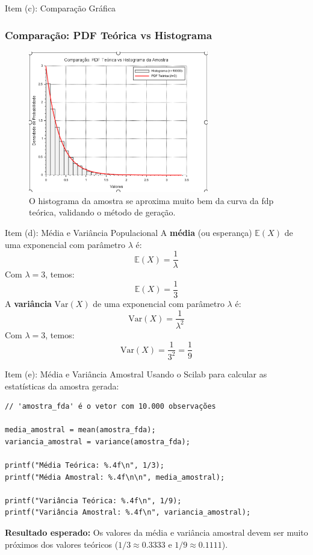 \begin{frame}{Item (c): Comparação Gráfica}
\frametitle{Comparação: PDF Teórica vs Histograma}
\begin{figure}
    \centering
    \includegraphics[width=0.7\textwidth]{figures/comparacao.png}
    \caption{O histograma da amostra se aproxima muito bem da curva da fdp teórica, validando o método de geração.}
    \label{fig:comparacao}
\end{figure}
\end{frame}


\begin{frame}{Item (d): Média e Variância Populacional}
A \textbf{média} (ou esperança) $\mathbb{E}(X)$ de uma exponencial com parâmetro $\lambda$ é:
\[
\mathbb{E}(X) = \frac{1}{\lambda}
\]
Com $\lambda = 3$, temos:
\[
\mathbb{E}(X) = \boxed{\frac{1}{3}}
\]
\vspace{1cm}
A \textbf{variância} $\text{Var}(X)$ de uma exponencial com parâmetro $\lambda$ é:
\[
\text{Var}(X) = \frac{1}{\lambda^2}
\]
Com $\lambda = 3$, temos:
\[
\text{Var}(X) = \frac{1}{3^2} = \boxed{\frac{1}{9}}
\]
\end{frame}

\begin{frame}[fragile]{Item (e): Média e Variância Amostral}
Usando o Scilab para calcular as estatísticas da amostra gerada:
\begin{lstlisting}
// 'amostra_fda' é o vetor com 10.000 observações

media_amostral = mean(amostra_fda);
variancia_amostral = variance(amostra_fda);

printf("Média Teórica: %.4f\n", 1/3);
printf("Média Amostral: %.4f\n\n", media_amostral);

printf("Variância Teórica: %.4f\n", 1/9);
printf("Variância Amostral: %.4f\n", variancia_amostral);
\end{lstlisting}
\vspace{0.5cm}
\textbf{Resultado esperado:} Os valores da média e variância amostral devem ser muito próximos dos valores teóricos ($1/3 \approx 0.3333$ e $1/9 \approx 0.1111$).
\end{frame}